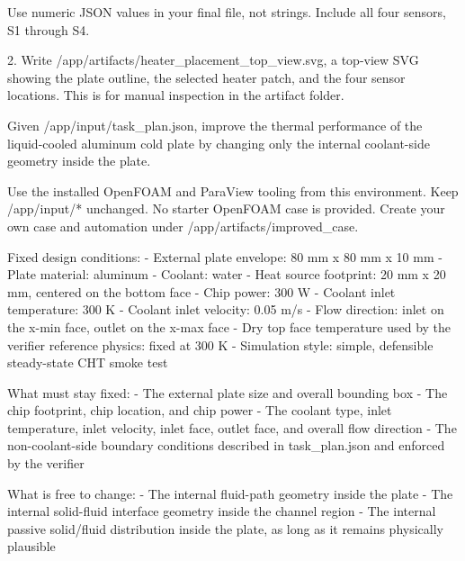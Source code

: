 \begin{instructionbox}
Use numeric JSON values in your final file, not strings. Include all four sensors, \textasciigrave{}S1\textasciigrave{} through \textasciigrave{}S4\textasciigrave{}.

2. Write \textasciigrave{}/app/artifacts/heater\_placement\_top\_view.svg\textasciigrave{}, a top-view SVG showing the plate outline, the selected heater patch, and the four sensor locations. This is for manual inspection in the artifact folder.
\end{instructionbox}

\begin{instructionbox}
Given \textasciigrave{}/app/input/task\_plan.json\textasciigrave{}, improve the thermal performance of the liquid-cooled aluminum cold plate by changing only the internal coolant-side geometry inside the plate.

Use the installed OpenFOAM and ParaView tooling from this environment. Keep \textasciigrave{}/app/input/*\textasciigrave{} unchanged. No starter OpenFOAM case is provided. Create your own case and automation under \textasciigrave{}/app/artifacts/improved\_case\textasciigrave{}.

Fixed design conditions:
- External plate envelope: \textasciigrave{}80 mm x 80 mm x 10 mm\textasciigrave{}
- Plate material: aluminum
- Coolant: water
- Heat source footprint: \textasciigrave{}20 mm x 20 mm\textasciigrave{}, centered on the bottom face
- Chip power: \textasciigrave{}300 W\textasciigrave{}
- Coolant inlet temperature: \textasciigrave{}300 K\textasciigrave{}
- Coolant inlet velocity: \textasciigrave{}0.05 m/s\textasciigrave{}
- Flow direction: inlet on the \textasciigrave{}x-min\textasciigrave{} face, outlet on the \textasciigrave{}x-max\textasciigrave{} face
- Dry top face temperature used by the verifier reference physics: fixed at \textasciigrave{}300 K\textasciigrave{}
- Simulation style: simple, defensible steady-state CHT smoke test

What must stay fixed:
- The external plate size and overall bounding box
- The chip footprint, chip location, and chip power
- The coolant type, inlet temperature, inlet velocity, inlet face, outlet face, and overall flow direction
- The non-coolant-side boundary conditions described in \textasciigrave{}task\_plan.json\textasciigrave{} and enforced by the verifier

What is free to change:
- The internal fluid-path geometry inside the plate
- The internal solid-fluid interface geometry inside the channel region
- The internal passive solid/fluid distribution inside the plate, as long as it remains physically plausible


\end{instructionbox}
